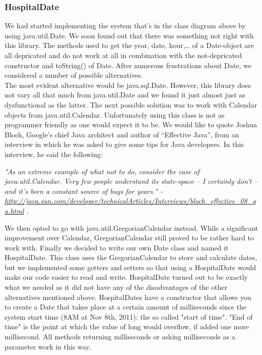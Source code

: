 \documentclass[11pt]{article}
\begin{document}
\subsubsection{HospitalDate}
We had started implementing the system that’s in the class diagram above by using java.util.Date. We soon found out that there was something not right with this library. The methods used to get the year, date, hour,… of a Date-object are all depricated and do not work at all in combination with the not-depricated constructor and toString() of Date. After numerous frustrations about Date, we considered a number of possible alternatives.
\\The most evident alternative would be java.sql.Date. However, this library does not vary all that much from java.util.Date and we found it just almost just as dysfunctional as the latter. The next possible solution was to work with Calendar objects from java.util.Calendar. Unfortunately using this class is not as programmer friendly as one would expect it to be. We would like to quote Joshua Bloch, Google's chief Java architect and author of “Effective Java”, from an interview in which he was asked to give some tips for Java developers. In this interview, he said the following:
\begin{center}
\emph{"As an extreme example of what not to do, consider the case of java.util.Calendar. Very few people understand its state-space -- I certainly don't -- and it's been a constant source of bugs for years." - \url{http://java.sun.com/developer/technicalArticles/Interviews/bloch_effective_08_qa.html} .}
\end{center}
We then opted to go with java.util.GregorianCalendar instead. While a significant improvement over Calendar, GregorianCalendar still proved to be rather hard to work with. Finally we decided to write our own Date class and named it HospitalDate. This class uses the GregorianCalendar to store and calculate dates, but we implemented some getters and setters so that using a HospitalDate would make our code easier to read and write. HospitalDate turned out to be exactly what we needed as it did not have any of the disadvantages of the other alternatives mentioned above.
\newline HospitalDates have a constructor that allows you to create a Date that takes place at a certain amount of milliseconds since the system start time (8AM at Nov 8th, 2011): the so called "start of time". "End of time" is the point at which the value of long would overflow, if added one more millisecond. All methods returning milliseconds or asking milliseconds as a parameter work in this way. 
\end{document}
